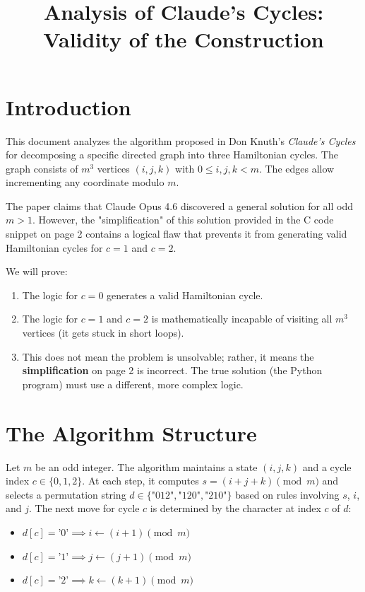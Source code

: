 \documentclass[12pt]{article}
\title{Analysis of \textbf{Claude's Cycles}: Validity of the Construction}
\author{}
\date{}
\begin{document}
\maketitle

\section{Introduction}
This document analyzes the algorithm proposed in Don Knuth's \textit{Claude's Cycles} for decomposing a specific directed graph into three Hamiltonian cycles. The graph consists of $m^3$ vertices $(i, j, k)$ with $0 \le i, j, k < m$. The edges allow incrementing any coordinate modulo $m$.

The paper claims that Claude Opus 4.6 discovered a general solution for all odd $m > 1$. However, the "simplification" of this solution provided in the C code snippet on page 2 contains a logical flaw that prevents it from generating valid Hamiltonian cycles for $c=1$ and $c=2$.

We will prove:
\begin{enumerate}
    \item The logic for $c=0$ generates a valid Hamiltonian cycle.
    \item The logic for $c=1$ and $c=2$ is mathematically incapable of visiting all $m^3$ vertices (it gets stuck in short loops).
    \item This does not mean the problem is unsolvable; rather, it means the \textbf{simplification} on page 2 is incorrect. The true solution (the Python program) must use a different, more complex logic.
\end{enumerate}

\section{The Algorithm Structure}
Let $m$ be an odd integer. The algorithm maintains a state $(i, j, k)$ and a cycle index $c \in \{0, 1, 2\}$.
At each step, it computes $s = (i + j + k) \pmod m$ and selects a permutation string $d \in \{\text{"012"}, \text{"120"}, \text{"210"}\}$ based on rules involving $s$, $i$, and $j$.
The next move for cycle $c$ is determined by the character at index $c$ of $d$:
\begin{itemize}
    \item $d[c] = \text{'0'} \implies i \leftarrow (i+1) \pmod m$
    \item $d[c] = \text{'1'} \implies j \leftarrow (j+1) \pmod m$
    \item $d[c] = \text{'2'} \implies k \leftarrow (k+1) \pmod m$
\end{itemize}
\end{document}

